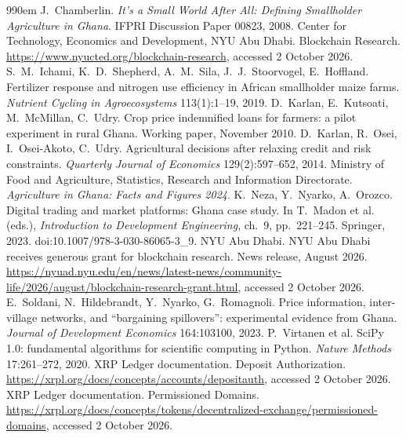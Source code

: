 \documentclass[11pt]{article}
\begin{document}
\begin{thebibliography}{99}\small\itemsep0em
 J.~Chamberlin. \emph{It's a Small World After All: Defining Smallholder Agriculture in Ghana}. IFPRI Discussion Paper 00823, 2008.
 Center for Technology, Economics and Development, NYU Abu Dhabi. Blockchain Research. \url{https://www.nyucted.org/blockchain-research}, accessed 2 October 2026.
 S.~M.~Ichami, K.~D.~Shepherd, A.~M.~Sila, J.~J.~Stoorvogel, E.~Hoffland. Fertilizer response and nitrogen use efficiency in African smallholder maize farms. \emph{Nutrient Cycling in Agroecosystems} 113(1):1--19, 2019.
 D.~Karlan, E.~Kutsoati, M.~McMillan, C.~Udry. Crop price indemnified loans for farmers: a pilot experiment in rural Ghana. Working paper, November 2010.
 D.~Karlan, R.~Osei, I.~Osei-Akoto, C.~Udry. Agricultural decisions after relaxing credit and risk constraints. \emph{Quarterly Journal of Economics} 129(2):597--652, 2014.
 Ministry of Food and Agriculture, Statistics, Research and Information Directorate. \emph{Agriculture in Ghana: Facts and Figures 2024}.
 K.~Neza, Y.~Nyarko, A.~Orozco. Digital trading and market platforms: Ghana case study. In T.~Madon et al. (eds.), \emph{Introduction to Development Engineering}, ch.~9, pp.~221--245. Springer, 2023. doi:10.1007/978-3-030-86065-3\_9.
 NYU Abu Dhabi. NYU Abu Dhabi receives generous grant for blockchain research. News release, August 2026. \url{https://nyuad.nyu.edu/en/news/latest-news/community-life/2026/august/blockchain-research-grant.html}, accessed 2 October 2026.
 E.~Soldani, N.~Hildebrandt, Y.~Nyarko, G.~Romagnoli. Price information, inter-village networks, and ``bargaining spillovers'': experimental evidence from Ghana. \emph{Journal of Development Economics} 164:103100, 2023.
 P.~Virtanen et al. SciPy 1.0: fundamental algorithms for scientific computing in Python. \emph{Nature Methods} 17:261--272, 2020.
 XRP Ledger documentation. Deposit Authorization. \url{https://xrpl.org/docs/concepts/accounts/depositauth}, accessed 2 October 2026.
 XRP Ledger documentation. Permissioned Domains. \url{https://xrpl.org/docs/concepts/tokens/decentralized-exchange/permissioned-domains}, accessed 2 October 2026.
\end{thebibliography}
\end{document}
